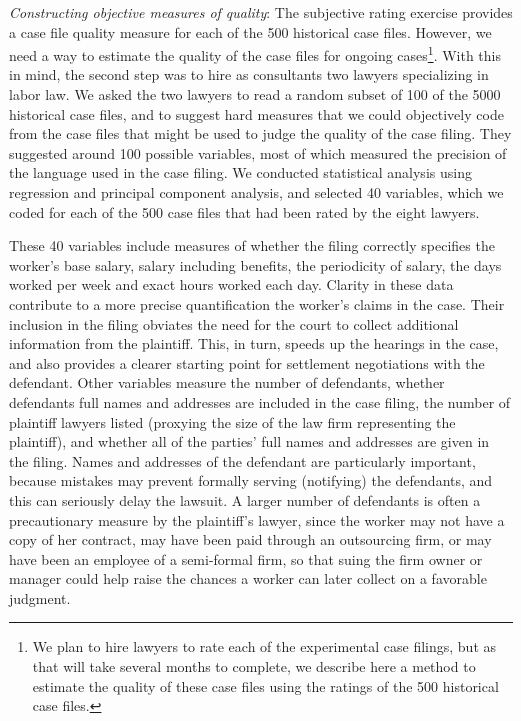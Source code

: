\documentclass[oneside,12pt]{article}
\begin{document}
\emph{Constructing objective measures of quality}: The subjective rating exercise provides a case file quality measure for each of the 500 historical case files. However, we need a way to estimate the quality of the case files for ongoing cases\footnote{We plan to hire lawyers to rate each of the experimental case filings, but as that will take several months to complete, we describe here a method to estimate the quality of these case files using the ratings of the 500 historical case files.}.  With this in mind, the second step was to hire as consultants two lawyers specializing in labor law. We asked the two lawyers to read a random subset of 100 of the 5000 historical case files, and to suggest hard measures that we could objectively code from the case files that might be used to judge the quality of the case filing. They suggested around 100 possible variables, most of which measured the precision of the language used in the case filing. We conducted statistical analysis using regression and principal component analysis, and selected 40 variables, which we coded for each of the 500 case files that had been rated by the eight lawyers. 

These 40 variables include measures of whether the filing correctly specifies the worker’s base salary, salary including benefits, the periodicity of salary, the days worked per week and exact hours worked each day. Clarity in these data contribute to a more precise quantification the worker’s claims in the case. Their inclusion in the filing obviates the need for the court to collect additional information from the plaintiff. This, in turn, speeds up the hearings in the case, and also provides a clearer starting point for settlement negotiations with the defendant. Other variables measure the number of defendants, whether defendants full names and addresses are included in the case filing, the number of plaintiff lawyers listed (proxying the size of the law firm representing the plaintiff), and whether all of the parties’ full names and addresses are given in the filing. Names and addresses of the defendant are particularly important, because mistakes may prevent formally serving (notifying) the defendants, and this can seriously delay the lawsuit. A larger number of defendants is often a precautionary measure by the plaintiff’s lawyer, since the worker may not have a copy of her contract, may have been paid through an outsourcing firm, or may have been an employee of a semi-formal firm, so that suing the firm owner or manager could help raise the chances a worker can later collect on a favorable judgment. 
\end{document}
